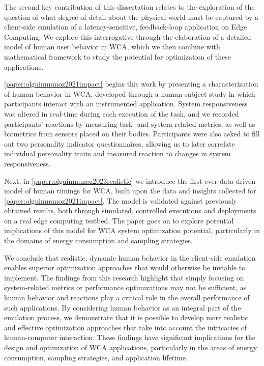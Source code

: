 \medskip

The second key contribution of this dissertation relates to the exploration of the question of what degree of detail about the physical world must be captured by a client-side emulation of a latency-sensitive, feedback-loop application on Edge Computing.
We explore this interrogative through the elaboration of a detailed model of human user behavior in \gls{WCA}, which we then combine with mathematical framework to study the potential for optimization of these applications.

\cref{paper:olguinmunoz2021impact} begins this work by presenting a characterization of human behavior in \gls{WCA}, developed through a human subject study in which participants interact with an instrumented application.
System responsiveness was altered in real-time during each execution of the task, and we recorded participants' reactions by measuring task- and system-related metrics, as well as biometrics from sensors placed on their bodies.
Participants were also asked to fill out two personality indicator questionnaires, allowing us to later correlate individual personality traits and measured reaction to changes in system responsiveness.

Next, in \cref{paper:olguinmunoz2023realistic} we introduce the first ever data-driven model of human timings for \gls{WCA}, built upon the data and insights collected for \cref{paper:olguinmunoz2021impact}.
The model is validated against previously obtained results, both through simulated, controlled executions and deployments on a real edge computing testbed.
The paper goes on to explore potential implications of this model for \gls{WCA} system optimization potential, particularly in the domains of energy consumption and sampling strategies.

We conclude that realistic, dynamic human behavior in the client-side emulation enables superior optimization approaches that would otherwise be inviable to implement.
The findings from this research highlight that simply focusing on system-related metrics or performance optimizations may not be sufficient, as human behavior and reactions play a critical role in the overall performance of such applications.
By considering human behavior as an integral part of the emulation process, we demonstrate that it is possible to develop more realistic and effective optimization approaches that take into account the intricacies of human-computer interaction.
These findings have significant implications for the design and optimization of \gls{WCA} applications, particularly in the areas of energy consumption, sampling strategies, and application lifetime.

